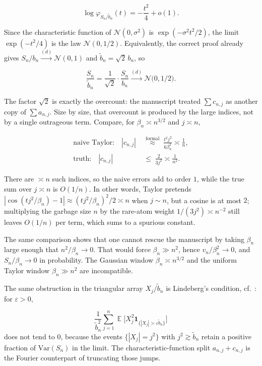 \documentclass[11pt,a4paper]{article}
\DeclareMathOperator{\E}{\mathbb{E}}
\begin{document}
\[
\log\varphi_{S_{n}/\tilde{b}_{n}}(t)
=
-\frac{t^{2}}{4}
+
o(1).
\]

Since the characteristic function of \(\mathcal{N}(0,\sigma^{2})\) is \(\exp(-\sigma^{2}t^{2}/2)\), the limit \(\exp(-t^{2}/4)\) is the law \(\mathcal{N}(0,1/2)\). Equivalently, the correct proof already gives \(S_{n}/b_{n}\xrightarrow{(d)}\mathcal{N}(0,1)\) and \(\tilde{b}_{n}=\sqrt{2}\,b_{n}\), so

\[
\frac{S_{n}}{\tilde{b}_{n}}
=
\frac{1}{\sqrt{2}}\cdot\frac{S_{n}}{b_{n}}
\xrightarrow{(d)}
\mathcal{N}\bigl(0,1/2\bigr).
\]

The factor \(\sqrt{2}\) is exactly the overcount: the manuscript treated \(\sum c_{n,j}\) as another copy of \(\sum a_{n,j}\). Size by size, that overcount is produced by the large indices, not by a single outrageous term. Compare, for \(\beta_{n}\asymp n^{3/2}\) and \(j\asymp n\),

\[
\begin{aligned}
\text{naive Taylor:}\quad
|c_{n,j}|
&\;\stackrel{\mathrm{formal}}{\approx}\;
\frac{t^{2}j^{2}}{6\beta_{n}^{2}}
\asymp
\frac{1}{n},
\\
\text{truth:}\quad
|c_{n,j}|
&\;\le\;
\frac{2}{3j^{2}}
\asymp
\frac{1}{n^{2}}.
\end{aligned}
\]

There are \(\asymp n\) such indices, so the naive errors add to order \(1\), while the true sum over \(j\asymp n\) is \(O(1/n)\). In other words, Taylor pretends \(|\cos(tj^{2}/\beta_{n})-1|\approx (tj^{2}/\beta_{n})^{2}/2\asymp n\) when \(j\sim n\), but a cosine is at most \(2\); multiplying the garbage size \(n\) by the rare-atom weight \(1/(3j^{2})\asymp n^{-2}\) still leaves \(O(1/n)\) per term, which sums to a spurious constant.

The same comparison shows that one cannot rescue the manuscript by taking \(\beta_{n}\) large enough that \(n^{2}/\beta_{n}\to 0\). That would force \(\beta_{n}\gg n^{2}\), hence \(v_{n}/\beta_{n}^{2}\to 0\), and \(S_{n}/\beta_{n}\to 0\) in probability. The Gaussian window \(\beta_{n}\asymp n^{3/2}\) and the uniform Taylor window \(\beta_{n}\gg n^{2}\) are incompatible.

\begin{remark}[Lindeberg]
\label{rem:problem-2-trap}
The same obstruction in the triangular array \(X_{j}/\tilde{b}_{n}\) is Lindeberg's condition, cf.\ \citep[Theorem~3.4.5]{durrett2010}: for \(\varepsilon>0\),

\[
\frac{1}{\tilde{b}_{n}^{2}}
\sum_{j=1}^{n}
\E\bigl[X_{j}^{2}\mathbf{1}_{\{|X_{j}|>\varepsilon\tilde{b}_{n}\}}\bigr]
\]
does not tend to \(0\), because the events \(\{|X_{j}|=j^{2}\}\) with \(j^{2}\gtrsim \tilde{b}_{n}\) retain a positive fraction of \(\mathrm{Var}(S_{n})\) in the limit. The characteristic-function split \(a_{n,j}+c_{n,j}\) is the Fourier counterpart of truncating those jumps.
\end{remark}
\end{document}
